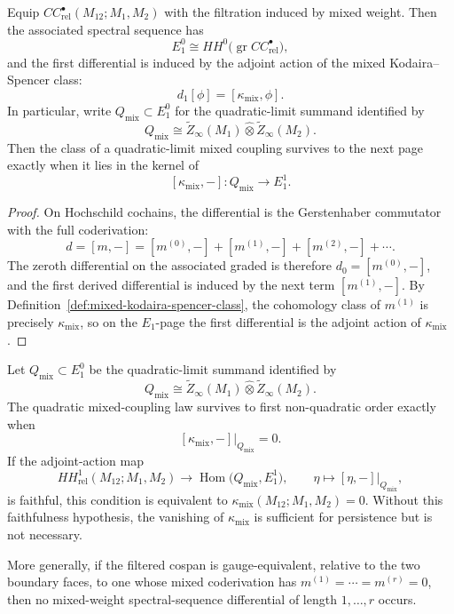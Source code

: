 \begin{theorem}
\label{thm:first-correction-theorem}
Equip $CC^\bullet_{\mathrm{rel}}(M_{12};M_1,M_2)$ with the filtration induced by mixed weight. Then the associated spectral sequence has
\[
E_1^0 \cong HH^0\bigl(\operatorname{gr} CC^\bullet_{\mathrm{rel}}\bigr),
\]
and the first differential is induced by the adjoint action of the mixed Kodaira--Spencer class:
\[
d_1[\phi] = [\kappa_{\mathrm{mix}},\phi].
\]
In particular, write $Q_{\mathrm{mix}}\subset E_1^0$ for the
quadratic-limit summand identified by
\[
Q_{\mathrm{mix}}
\cong
\widetilde Z_\infty(M_1)\widehat\otimes \widetilde Z_\infty(M_2).
\]
Then the class of a quadratic-limit mixed coupling survives to the next
page exactly when it lies in the kernel of
\[
[\kappa_{\mathrm{mix}},-] :
Q_{\mathrm{mix}}
\longrightarrow E_1^1.
\]
\end{theorem}

\begin{proof}
On Hochschild cochains, the differential is the Gerstenhaber commutator with the full coderivation:
\[
d = [m,-] = [m^{(0)},-] + [m^{(1)},-] + [m^{(2)},-] + \cdots.
\]
The zeroth differential on the associated graded is therefore $d_0=[m^{(0)},-]$, and the first derived differential is induced by the next term $[m^{(1)},-]$. By Definition~\ref{def:mixed-kodaira-spencer-class}, the cohomology class of $m^{(1)}$ is precisely $\kappa_{\mathrm{mix}}$, so on the $E_1$-page the first differential is the adjoint action of $\kappa_{\mathrm{mix}}$.
\end{proof}

\begin{corollary}
\label{cor:persistence-criterion-quadratic-law}
Let $Q_{\mathrm{mix}}\subset E_1^0$ be the quadratic-limit summand
identified by
\[
Q_{\mathrm{mix}}
\cong
\widetilde Z_\infty(M_1)\widehat\otimes \widetilde Z_\infty(M_2).
\]
The quadratic mixed-coupling law survives to first non-quadratic order
exactly when
\[
[\kappa_{\mathrm{mix}},-]\big|_{Q_{\mathrm{mix}}}=0.
\]
If the adjoint-action map
\[
HH^1_{\mathrm{rel}}(M_{12};M_1,M_2)
\longrightarrow
\operatorname{Hom}\bigl(Q_{\mathrm{mix}},E_1^1\bigr),
\qquad
\eta\longmapsto [\eta,-]\big|_{Q_{\mathrm{mix}}},
\]
is faithful, this condition is equivalent to
$\kappa_{\mathrm{mix}}(M_{12};M_1,M_2)=0$. Without this faithfulness
hypothesis, the vanishing of $\kappa_{\mathrm{mix}}$ is sufficient for
persistence but is not necessary.

More generally, if the filtered cospan is gauge-equivalent, relative to
the two boundary faces, to one whose mixed coderivation has
$m^{(1)}=\cdots=m^{(r)}=0$, then no mixed-weight spectral-sequence
differential of length $1,\dots,r$ occurs.
\end{corollary}

